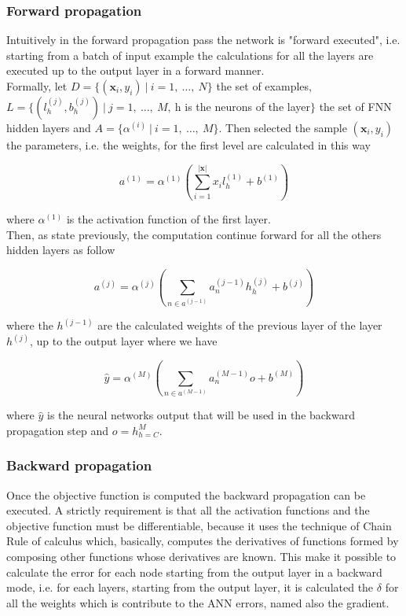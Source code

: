 \subsubsection{Forward propagation}
Intuitively in the forward propagation pass the network is "forward executed", i.e. starting from a batch of input example the calculations for all the layers are executed up to the output layer in a forward manner. \\
Formally, let $D = \{(\textbf{x}_{i}, y_{i})\ |\ i=1,\ \dots ,\ N \}$ the set of examples, $L = \{(l^{(j)}_{h}, b^{(j)}_{h})\ |\ j = 1,\ \dots,\ M,\ $h is the neurons of the layer$\}$ the set of FNN hidden layers and $A = \{\alpha^{(i)}\ |\ i = 1,\ \dots,\ M\}$. Then selected the sample $(\textbf{x}_i, y_i)$ the parameters, i.e. the weights, for the first level are calculated in this way
\begin{center}
	\begin{equation}
	a^{(1)} = \alpha^{(1)}(\sum\limits_{i=1}^{|\textbf{x}|}x_{i}l_{h}^{(1)} + b^{(1)})
	\end{equation}
\end{center}
where $\alpha^{(1)}$ is the activation function of the first layer.\\
Then, as state previously, the computation continue forward for all the others hidden layers as follow
\begin{center}
	\begin{equation}
	a^{(j)} = \alpha^{(j)}(\sum\limits_{n \in a^{(j - 1)}}a^{(j - 1)}_{n}h^{(j)}_{h} + b^{(j)})
	\end{equation}
\end{center}
where the $h^{(j - 1)}$ are the calculated weights of the previous layer of the layer $h^{(j)}$, up to the output layer where we have
\begin{center}
	\begin{equation}
	\hat{y} = \alpha^{(M)}(\sum\limits_{n \in a^{(M - 1)}}a^{(M - 1)}_{n}o + b^{(M)})	
	\end{equation}
\end{center}
where $\hat{y}$ is the neural networks output that will be used in the backward propagation step and $o = h^{M}_{h = C}$.

\subsubsection{Backward propagation}
Once the objective function is computed the backward propagation can be executed. A strictly requirement is that all the activation functions and the objective function must be differentiable, because it uses the technique of Chain Rule of calculus which, basically, computes the derivatives of functions formed by composing other functions whose derivatives are known.
This make it possible to calculate the error for each node starting from the output layer in a backward mode, i.e. for each layers, starting from the output layer, it is calculated the $\delta$ for all the weights which is contribute to the ANN errors, named also the gradient.

